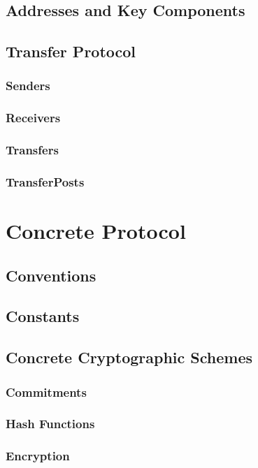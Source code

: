 \documentclass[a4paper]{article}
\newcommand{\lsection}[2]{\def\sectionlabel{#2} \section{#1}\label{sec:#2}}
\newcommand{\lsubsection}[2]{\def\sectionlabel{#2} \subsection{#1}\label{sec:#2}}
\theoremstyle{definition}
\newcommand{\Receiver}{{\textsf{Receiver}}}
\newcommand{\Sender}{{\textsf{Sender}}}
\newcommand{\TransferPost}{{\textsf{TransferPost}}}
\newcommand{\Transfer}{{\textsf{Transfer}}}
\begin{document}
\lsubsection{Addresses and Key Components}{addresses-and-key-components}

\lsubsection{\Transfer{} Protocol}{transfer-protocol}

\subsubsection{\Sender{s}}

\subsubsection{\Receiver{s}}

\subsubsection{\Transfer{s}}

\subsubsection{\TransferPost{s}}

\lsection{Concrete Protocol}{concrete-protocol}

\subsection{Conventions}

\subsection{Constants}

\subsection{Concrete Cryptographic Schemes}

\subsubsection{Commitments}

\subsubsection{Hash Functions}

\subsubsection{Encryption}
\end{document}
